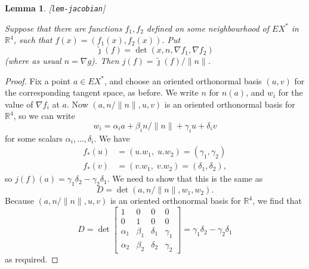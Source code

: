 \documentclass[reqno]{amsart}
\newcommand{\lbl}[1]{\label{#1}\textup{[\texttt{#1}]}\par}
\newcommand{\lbl}{\label}
\newcommand{\al}        {\alpha}
\newcommand{\bt}        {\beta}
\newcommand{\gm}        {\gamma}
\newcommand{\dl}        {\delta}
\newcommand{\R}         {{\mathbb{R}}}
\newcommand{\bbm}       {\left[\begin{matrix}}
\newcommand{\ebm}       {\end{matrix}\right]}
\newcommand{\tj}	{\widetilde{\jmath}}
\renewcommand{\:}{\colon}
\newtheorem{lemma}[theorem]{Lemma}
\theoremstyle{definition}
\begin{document}
\begin{lemma}\lbl{lem-jacobian}
 Suppose that there are functions $f_1,f_2$ defined on some
 neighbourhood of $EX^*$ in $\R^4$, such that $f(x)=(f_1(x),f_2(x))$.
 Put
 \[ \tj(f) =
     \det\left(x,n,\nabla f_1,\nabla f_2\right)
 \]
 (where as usual $n=\nabla g$).  Then $j(f)=\tj(f)/\|n\|$.
\end{lemma}
\begin{proof}
 Fix a point $a\in EX^*$, and choose an oriented orthonormal basis
 $(u,v)$ for the corresponding tangent space, as before.  We write
 $n$ for $n(a)$, and $w_i$ for the value of $\nabla f_i$ at $a$.  Now
 $(a,n/\|n\|,u,v)$ is an oriented orthonormal basis for $\R^4$, so
 we can write
 \[ w_i = \al_i a + \bt_i n/\|n\| + \gm_i u + \dl_i v \]
 for some scalars $\al_i,\dotsc,\dl_i$.  We have
 \begin{align*}
  f_*(u) &= (u.w_1,\;u.w_2) = (\gm_1,\gm_2) \\
  f_*(v) &= (v.w_1,\;v.w_2) = (\dl_1,\dl_2),
 \end{align*}
 so $j(f)(a)=\gm_1\dl_2-\gm_2\dl_1$.  We need to show that this is the
 same as
 \[ D = \det(a,n/\|n\|,w_1,w_2). \]
 Because $(a,n/\|n\|,u,v)$ is an oriented orthonormal basis for
 $\R^4$, we find that
 \[ D = \det
    \bbm
     1     & 0     & 0     & 0     \\
     0     & 1     & 0     & 0     \\
     \al_1 & \bt_1 & \dl_1 & \gm_1 \\
     \al_2 & \bt_2 & \dl_2 & \gm_2
    \ebm = \gm_1\dl_2-\gm_2\dl_1
 \]
 as required.
\end{proof}
\end{document}
